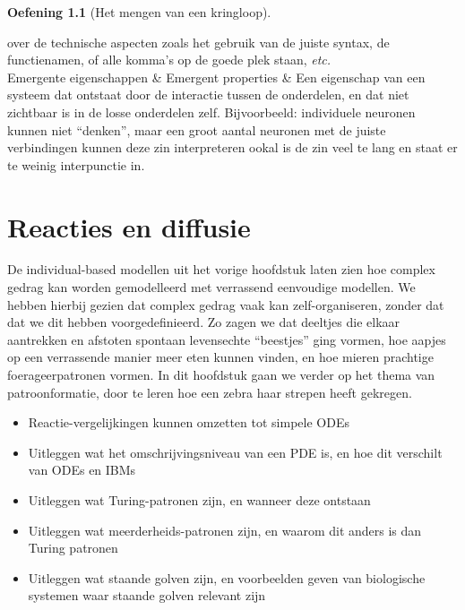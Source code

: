 \documentclass[
  a4paper,
]{scrbook}
\providecommand{\tightlist}{%
  \setlength{\itemsep}{0pt}\setlength{\parskip}{0pt}}\usepackage{longtable,booktabs,array}
\theoremstyle{definition}
\newtheorem{exercise}{Oefening}[chapter]
\theoremstyle{remark}
\begin{document}
\begin{exercise}[Het mengen van een
kringloop]
\begin{longtable}[]
over de technische aspecten zoals het gebruik van de juiste syntax, de
functienamen, of alle komma's op de goede plek staan, \emph{etc.} \\
Emergente eigenschappen & Emergent properties & Een eigenschap van een
systeem dat ontstaat door de interactie tussen de onderdelen, en dat
niet zichtbaar is in de losse onderdelen zelf. Bijvoorbeeld: individuele
neuronen kunnen niet ``denken'', maar een groot aantal neuronen met de
juiste verbindingen kunnen deze zin interpreteren ookal is de zin veel
te lang en staat er te weinig interpunctie in. \\
\end{longtable}

\chapter{Reacties en diffusie}\label{reacties-en-diffusie}

De individual-based modellen uit het vorige hoofdstuk laten zien hoe
complex gedrag kan worden gemodelleerd met verrassend eenvoudige
modellen. We hebben hierbij gezien dat complex gedrag vaak kan
zelf-organiseren, zonder dat dat we dit hebben voorgedefinieerd. Zo
zagen we dat deeltjes die elkaar aantrekken en afstoten spontaan
levensechte ``beestjes'' ging vormen, hoe aapjes op een verrassende
manier meer eten kunnen vinden, en hoe mieren prachtige
foerageerpatronen vormen. In dit hoofdstuk gaan we verder op het thema
van patroonformatie, door te leren hoe een zebra haar strepen heeft
gekregen.

\begin{itemize}
\tightlist
\item
  Reactie-vergelijkingen kunnen omzetten tot simpele ODEs
\item
  Uitleggen wat het omschrijvingsniveau van een PDE is, en hoe dit
  verschilt van ODEs en IBMs
\item
  Uitleggen wat Turing-patronen zijn, en wanneer deze ontstaan
\item
  Uitleggen wat meerderheids-patronen zijn, en waarom dit anders is dan
  Turing patronen
\item
  Uitleggen wat staande golven zijn, en voorbeelden geven van
  biologische systemen waar staande golven relevant zijn
\end{itemize}


\end{exercise}
\end{document}
